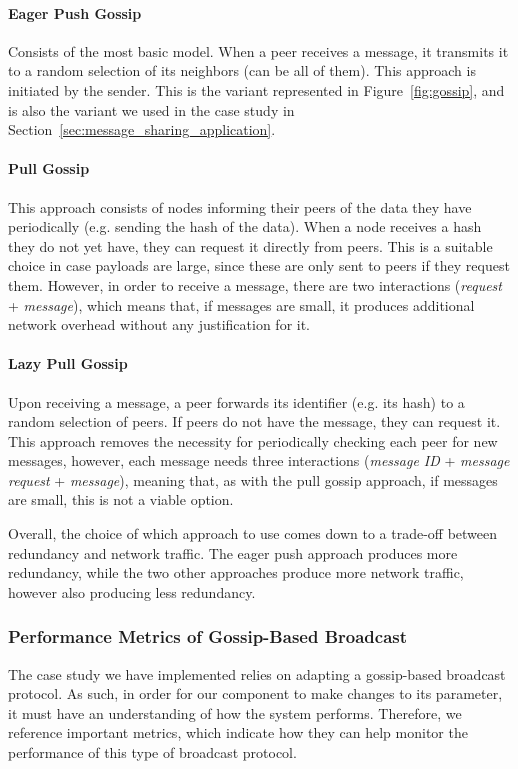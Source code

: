 \paragraph{Eager Push Gossip} Consists of the most basic model. When a peer receives a message, it transmits it to a random selection of its neighbors (can be all of them). This approach is initiated by the sender. This is the variant represented in Figure~\ref{fig:gossip}, and is also the variant we used in the case study in Section~\ref{sec:message_sharing_application}.

\paragraph{Pull Gossip} This approach consists of nodes informing their peers of the data they have periodically (e.g. sending the hash of the data). When a node receives a hash they do not yet have, they can request it directly from peers. This is a suitable choice in case payloads are large, since these are only sent to peers if they request them. However, in order to receive a message, there are two interactions (\textit{request} + \textit{message}), which means that, if messages are small, it produces additional network overhead without any justification for it.

\paragraph{Lazy Pull Gossip} Upon receiving a message, a peer forwards its identifier (e.g. its hash) to a random selection of peers. If peers do not have the message, they can request it. This approach removes the necessity for periodically checking each peer for new messages, however, each message needs three interactions (\textit{message ID} + \textit{message request} + \textit{message}), meaning that, as with the pull gossip approach, if messages are small, this is not a viable option.

Overall, the choice of which approach to use comes down to a trade-off between redundancy and network traffic. The eager push approach produces more redundancy, while the two other approaches produce more network traffic, however also producing less redundancy.

\subsubsection*{Performance Metrics of Gossip-Based Broadcast}
\label{sssec:perfrmance_metrics_of_gossip_based_broadcast}
The case study we have implemented relies on adapting a gossip-based broadcast protocol. As such, in order for our component to make changes to its parameter, it must have an understanding of how the system performs. Therefore, we reference important metrics\cite{Leitao2007a, Leitao2010a}, which indicate how they can help monitor the performance of this type of broadcast protocol.

